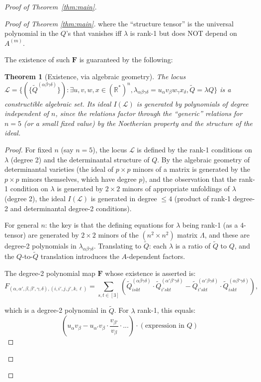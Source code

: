 \documentclass[12pt]{article}
\newtheorem{theorem}{Theorem}
\theoremstyle{definition}
\begin{document}
\begin{proof}[Proof of Theorem~\ref{thm:main}]
\begin{proof}[Proof of Theorem \ref{thm:main}]
where the ``structure tensor'' is the universal polynomial in the $Q$'s that vanishes iff $\lambda$ is rank-1 but does NOT depend on $A^{(m)}$.

The existence of such $\mathbf{F}$ is guaranteed by the following:

\begin{theorem}[Existence, via algebraic geometry]\label{thm:existence}
The locus $\mathcal{L} = \{(\{\tilde Q^{(\alpha\beta\gamma\delta)}\}) : \exists u,v,w,x\in(\mathbb{R}^*)^n, \lambda_{\alpha\beta\gamma\delta} = u_\alpha v_\beta w_\gamma x_\delta, \tilde Q = \lambda Q\}$ is a constructible algebraic set. Its ideal $I(\mathcal{L})$ is generated by polynomials of degree independent of $n$, since the relations factor through the ``generic'' relations for $n = 5$ (or a small fixed value) by the Noetherian property and the structure of the ideal.
\end{theorem}

\begin{proof}
For fixed $n$ (say $n = 5$), the locus $\mathcal{L}$ is defined by the rank-1 conditions on $\lambda$ (degree 2) and the determinantal structure of $Q$. By the algebraic geometry of determinantal varieties (the ideal of $p\times p$ minors of a matrix is generated by the $p\times p$ minors themselves, which have degree $p$), and the observation that the rank-1 condition on $\lambda$ is generated by $2\times 2$ minors of appropriate unfoldings of $\lambda$ (degree 2), the ideal $I(\mathcal{L})$ is generated in degree $\leq 4$ (product of rank-1 degree-2 and determinantal degree-2 conditions).

For general $n$: the key is that the defining equations for $\lambda$ being rank-1 (as a $4$-tensor) are generated by $2\times 2$ minors of the $(n^2\times n^2)$ matrix $\Lambda$, and these are degree-2 polynomials in $\lambda_{\alpha\beta\gamma\delta}$. Translating to $\tilde{Q}$: each $\lambda$ is a ratio of $\tilde{Q}$ to $Q$, and the $Q$-to-$\tilde{Q}$ translation introduces the $A$-dependent factors.

The degree-2 polynomial map $\mathbf{F}$ whose existence is asserted is:
$$F_{(\alpha,\alpha',\beta,\beta',\gamma,\delta),(i,i',j,j',k,\ell)} = \sum_{s,t\in[3]}\left(\tilde{Q}^{(\alpha\beta\gamma\delta)}_{iskt}\cdot\tilde{Q}^{(\alpha'\beta'\gamma\delta)}_{i'skt} - \tilde{Q}^{(\alpha'\beta\gamma\delta)}_{i'sk t}\cdot\tilde{Q}^{(\alpha\beta'\gamma\delta)}_{iskt}\right),$$

which is a degree-2 polynomial in $\tilde{Q}$. For $\lambda$ rank-1, this equals:
$$(u_\alpha v_\beta - u_{\alpha'}v_\beta\cdot\frac{v_{\beta'}}{v_\beta}\cdot...) \cdot (\text{expression in }Q)$$


\end{proof}
\end{proof}
\end{proof}
\end{document}
